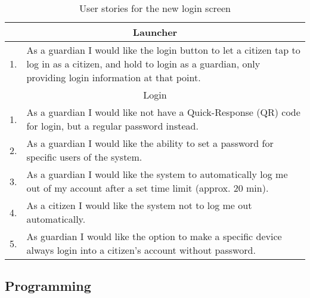 \begin{table}[H]
\begin{tabular}{|c|p{12.5cm}|}
\hline 
\multicolumn{2}{|c|}{Launcher}\\
\hline
1. & As a guardian I would like the login button to let a citizen tap to log in
as a citizen, and hold to login as a guardian, only providing login information
at that point. \\ \hline
\multicolumn{2}{|c|}{Login}\\ \hline
1. & As a guardian I would like not have a Quick-Response (QR) code for login,
but a regular password instead.\\ \hline
2. & As a guardian I would like the ability to set a password for specific users
of the system.\\ \hline
3. & As a guardian I would like the system to automatically log me out of my
account after a set time limit (approx. 20 min).\\ \hline
4. & As a citizen I would like the system not to log me out automatically.\\ \hline
5. & As guardian I would like the option to make a specific device always login
into a citizen's account without password.\\ \hline
\end{tabular}
\caption{User stories for the new login screen}
\label{UserStoriesLogin}
\end{table}

% 
% 
% 
% 
\subsection{Programming}




